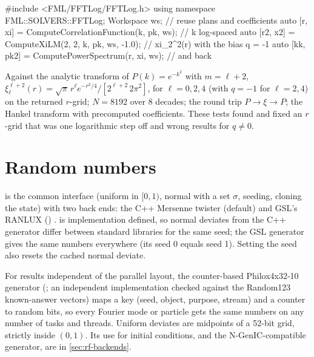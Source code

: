 \begin{cppcode}
#include <FML/FFTLog/FFTLog.h>
using namespace FML::SOLVERS::FFTLog;
Workspace ws;                                          // reuse plans and coefficients
auto [r, xi]  = ComputeCorrelationFunction(k, pk, ws); // k log-spaced
auto [r2, x2] = ComputeXiLM(2, 2, k, pk, ws, -1.0);    // xi_2^2(r) with the bias q = -1
auto [kk, pk2] = ComputePowerSpectrum(r, xi, ws);      // and back
\end{cppcode}

\begin{validation}
Against the analytic transform of $P(k)=e^{-k^2}$ with $m=\ell+2$,
$\xi_\ell^{\ell+2}(r)=\sqrt\pi\,r^\ell e^{-r^2/4}/[2^{\ell+2}\,2\pi^2]$, for $\ell=0,2,4$ (with $q=-1$ for $\ell=2,4$) on the
returned $r$-grid; $N=8192$ over 8 decades; the round trip $P\to\xi\to P$; the Hankel transform with precomputed coefficients.
These tests found and fixed an $r$-grid that was one logarithmic step off and wrong results for $q\neq0$.
\end{validation}

\section{Random numbers}\label{sec:num-random}

 is the common interface (uniform in $[0,1)$, normal with a set $\sigma$, seeding, cloning the state)
with two back ends: the C++  Mersenne twister \cite{Matsumoto1998} (default) and GSL's RANLUX
() \cite{Luscher1994}.  is implementation defined, so normal deviates from the C++
generator differ between standard libraries for the same seed; the GSL generator gives the same numbers everywhere (its seed 0
equals seed 1). Setting the seed also resets the cached normal deviate.

For results independent of the parallel layout, the counter-based Philox4x32-10 generator \cite{Salmon2011}
(; an independent implementation checked against the Random123 known-answer vectors) maps a key
(seed, object, purpose, stream) and a counter to random bits, so every Fourier mode or particle gets the same numbers on any
number of tasks and threads. Uniform deviates are midpoints of a 52-bit grid, strictly inside $(0,1)$. Its use for initial
conditions, and the N-GenIC-compatible generator, are in \cref{sec:rf-backends}.

